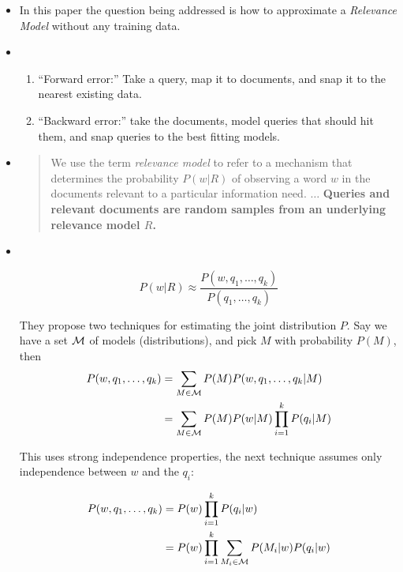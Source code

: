 \documentclass{article}
\begin{document}
\begin{itemize}

\item In this paper the question being addressed is how to approximate a \emph{Relevance Model} without any training data.

\item {}
    \begin{enumerate}
        \item ``Forward error:''  Take a query, map it to documents, and snap it to the nearest existing data.
        \item ``Backward error:'' take the documents, model queries that should hit them, and snap queries to the best fitting models.
    \end{enumerate}

\item {}
        \begin{quote}
            We use the term \emph{relevance model} to refer to a mechanism that determines the probability $P(w|R)$ of observing a word $w$ in the documents relevant to a particular information need. $\dots$ {\bf Queries and relevant documents are random samples from an underlying relevance model $R$.}
        \end{quote}



\item {}\\

    \[ P(w|R) \approx \frac{P(w,q_1,\dots,q_k)}{P(q_1,\dots,q_k)} \]
    
    They propose two techniques for estimating the joint distribution $P$.  Say we have a set $\mathcal{M}$ of models (distributions), and pick $M$ with probability $P(M)$, then
    \begin{align*}
        P(w,q_1,\dots,q_k) 
           & =  \sum_{M \in \mathcal{M}} P(M)P(w,q_1,\dots,q_k|M) \\
           & =  \sum_{M \in \mathcal{M}} P(M)P(w|M)\prod_{i=1}^k P(q_i|M)
    \end{align*}
    
    This uses strong independence properties, the next technique assumes only independence between $w$ and the $q_i$:

    \begin{align*}
        P(w,q_1,\dots,q_k) & = P(w)\prod_{i=1}^k P(q_i|w)  \\
              & = P(w)\prod_{i=1}^k \sum_{M_i \in \mathcal{M}} P(M_i|w)P(q_i|w)
    \end{align*}

\end{itemize}
\end{document}
